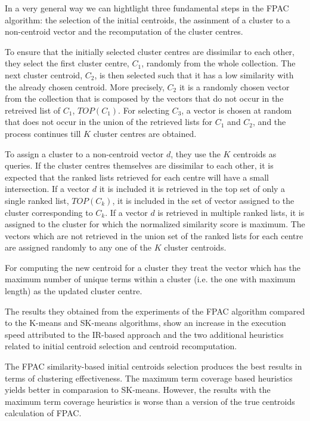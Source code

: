 \documentclass[runningheads]{llncs}
\begin{document}
In a very general way we can hightlight three fundamental
steps in the FPAC algorithm: the selection of the initial centroids, the assinment of a cluster to a non-centroid vector and the recomputation of the cluster centres.

To ensure that the initially selected cluster centres are dissimilar
to each other, they select the first cluster centre, $C_1$, randomly from
the whole collection. The next cluster centroid, $C_2$, is then selected
such that it has a low similarity with the already chosen centroid.
More precisely, $C_2$ it is a randomly chosen vector from the collection
that is composed by the vectors that do not occur in the retreived list of 
$C_1$, $TOP(C_1)$. For selecting $C_3$, a vector is chosen at random that
does not occur in the union of the retrieved lists for $C_1$ and $C_2$, and
the process continues till $K$ cluster centres are obtained.

To assign a cluster to a non-centroid vector $d$, they use the $K$ centroids
as queries. If the cluster centres themselves are dissimilar to
each other, it is expected that the ranked lists retrieved for each
centre will have a small intersection. If a vector $d$ it is included it
is retrieved in the top set of only a single ranked list, $TOP(C_k)$,
it is included in the set of vector assigned to the cluster corresponding
to $C_k$. If a vector $d$ is retrieved in multiple ranked lists, 
it is assigned to the cluster for which the normalized
similarity score is maximum. The vectors which are not retrieved in the
union set of the ranked lists for each 
centre are assigned randomly to any one of the $K$ cluster centroids.

For computing the new centroid for a cluster they treat the vector 
which has the maximum number of unique terms within a cluster (i.e. 
the one with maximum length) as the updated cluster centre.


The results they obtained from the experiments of the FPAC algorithm
compared to the K-means and SK-means algorithms,
show an increase in the execution speed attributed to the IR-based approach
and the two additional heuristics related to initial centroid selection and 
centroid recomputation.

The FPAC similarity-based initial centroids selection
produces the best results in terms of clustering effectiveness.
The maximum term coverage based heuristics yields better in
comparasion to SK-means. However, the results with the
maximum term coverage heuristics is worse than a version of
the true centroids calculation of FPAC.
\end{document}
